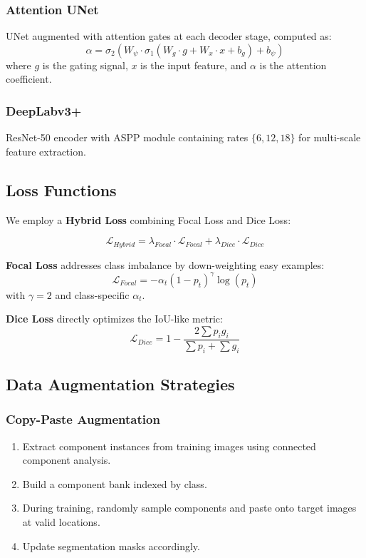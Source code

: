 \documentclass[12pt,a4paper]{article}
\begin{document}
\subsubsection{Attention UNet}
UNet augmented with attention gates at each decoder stage, computed as:
\begin{equation}
    \alpha = \sigma_2(W_\psi \cdot \sigma_1(W_g \cdot g + W_x \cdot x + b_g) + b_\psi)
\end{equation}
where $g$ is the gating signal, $x$ is the input feature, and $\alpha$ is the attention coefficient.

\subsubsection{DeepLabv3+}
ResNet-50 encoder with ASPP module containing rates $\{6, 12, 18\}$ for multi-scale feature extraction.

\subsection{Loss Functions}

We employ a \textbf{Hybrid Loss} combining Focal Loss and Dice Loss:

\begin{equation}
    \mathcal{L}_{Hybrid} = \lambda_{Focal} \cdot \mathcal{L}_{Focal} + \lambda_{Dice} \cdot \mathcal{L}_{Dice}
\end{equation}

\textbf{Focal Loss} addresses class imbalance by down-weighting easy examples:
\begin{equation}
    \mathcal{L}_{Focal} = -\alpha_t (1 - p_t)^\gamma \log(p_t)
\end{equation}
with $\gamma = 2$ and class-specific $\alpha_t$.

\textbf{Dice Loss} directly optimizes the IoU-like metric:
\begin{equation}
    \mathcal{L}_{Dice} = 1 - \frac{2 \sum p_i g_i}{\sum p_i + \sum g_i}
\end{equation}

\subsection{Data Augmentation Strategies}

\subsubsection{Copy-Paste Augmentation}
\begin{enumerate}
    \item Extract component instances from training images using connected component analysis.
    \item Build a component bank indexed by class.
    \item During training, randomly sample components and paste onto target images at valid locations.
    \item Update segmentation masks accordingly.
\end{enumerate}
\end{document}
